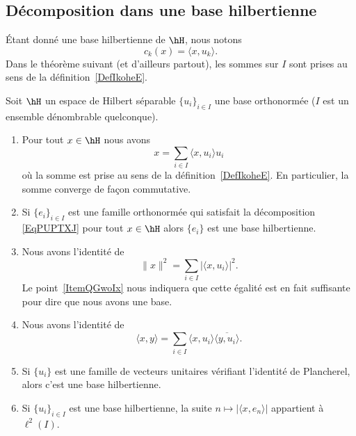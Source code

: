 \subsection{Décomposition dans une base hilbertienne}

Étant donné une base hilbertienne de \( \hH\), nous notons
\begin{equation}
	c_k(x)=\langle x, u_k\rangle .
\end{equation}
Dans le théorème suivant (et d'ailleurs partout), les sommes sur \( I\) sont prises au sens de la définition~\ref{DefIkoheE}.


\begin{theorem}     \label{ThoyAjoqP}
	Soit \( \hH\) un espace de Hilbert séparable \( \{ u_i \}_{i\in I}\) une base orthonormée (\( I\) est un ensemble dénombrable quelconque).

	\begin{enumerate}
		\item \label{ItemQGwoIxi}
		      Pour tout \( x\in \hH\) nous avons
		      \begin{equation}        \label{EqPUPTXJ}
			      x=\sum_{i\in I}\langle x, u_i\rangle u_i
		      \end{equation}
		      où la somme est prise au sens de la définition~\ref{DefIkoheE}. En particulier, la somme converge de façon commutative.

		\item

		      Si \( \{ e_i \}_{i\in I}\) est une famille orthonormée qui satisfait la décomposition \eqref{EqPUPTXJ} pour tout \( x\in \hH\) alors \( \{ e_i \}\) est une base hilbertienne.
		\item
		      Nous avons l'identité de 
		      \begin{equation}
			      \| x \|^2=\sum_{i\in I}| \langle x, u_i\rangle  |^2.
		      \end{equation}
		      Le point~\ref{ItemQGwoIx} nous indiquera que cette égalité est en fait suffisante pour dire que nous avons une base.
		\item
		      Nous avons l'identité de 
		      \begin{equation}    \label{EqHZxjtKt}
			      \langle x, y\rangle =\sum_{i\in I}\langle x, u_i\rangle \overline{ \langle y, u_i\rangle  }.
		      \end{equation}
		\item   \label{ItemQGwoIx}
		      Si \( \{ u_i \}\) est une famille de vecteurs unitaires vérifiant l'identité de Plancherel, alors c'est une base hilbertienne.
		\item
		      Si \( \{ u_i \}_{i\in I}\) est une base hilbertienne, la suite \( n\mapsto| \langle x, e_n\rangle  |\) appartient à \( \ell^2(I)\).
	\end{enumerate}
\end{theorem}

